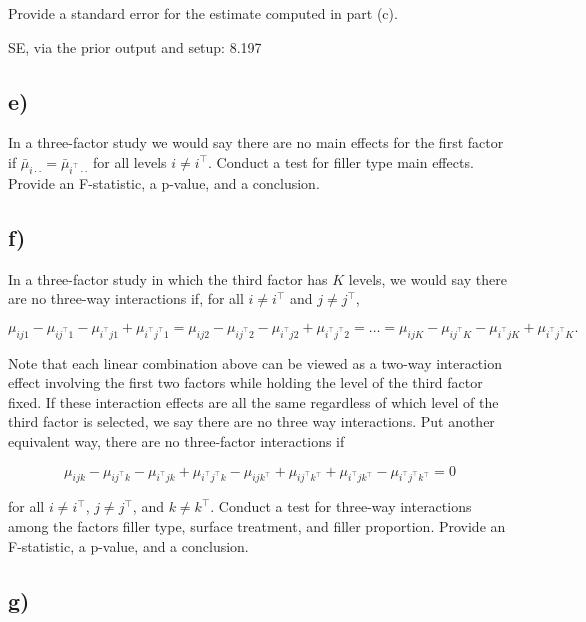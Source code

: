 \documentclass[
]{article}
\begin{document}
Provide a standard error for the estimate computed in part (c).

SE, via the prior output and setup: 8.197

\newpage

\subsection{e)}\label{e}

In a three-factor study we would say there are no main effects for the
first factor if
\(\bar{\mu}_{i \cdot \cdot} = \bar{\mu}_{i^{\top} \cdot \cdot}\) for all
levels \(i \neq i^{\top}\). Conduct a test for filler type main effects.
Provide an F-statistic, a p-value, and a conclusion.

\newpage

\subsection{f)}\label{f}

In a three-factor study in which the third factor has \(K\) levels, we
would say there are no three-way interactions if, for all
\(i \neq i^{\top}\) and \(j \neq j^{\top}\),

\[
\mu_{ij1} - \mu_{ij^{\top}1} - \mu_{i^{\top}j1} + \mu_{i^{\top}j^{\top}1} = \mu_{ij2} - \mu_{ij^{\top}2} - \mu_{i^{\top}j2} + \mu_{i^{\top}j^{\top}2} = \dots = \mu_{ijK} - \mu_{ij^{\top}K} - \mu_{i^{\top}jK} + \mu_{i^{\top}j^{\top}K}.
\]

Note that each linear combination above can be viewed as a two-way
interaction effect involving the first two factors while holding the
level of the third factor fixed. If these interaction effects are all
the same regardless of which level of the third factor is selected, we
say there are no three way interactions. Put another equivalent way,
there are no three-factor interactions if

\[
\mu_{ijk} - \mu_{ij^{\top}k} - \mu_{i^{\top}jk} + \mu_{i^{\top}j^{\top}k} - \mu_{ijk^{\top}} + \mu_{ij^{\top}k^{\top}} + \mu_{i^{\top}jk^{\top}} - \mu_{i^{\top}j^{\top}k^{\top}} = 0
\]

for all \(i \neq i^{\top}\), \(j \neq j^{\top}\), and
\(k \neq k^{\top}\). Conduct a test for three-way interactions among the
factors filler type, surface treatment, and filler proportion. Provide
an F-statistic, a p-value, and a conclusion.

\newpage

\subsection{g)}\label{g}
\end{document}
